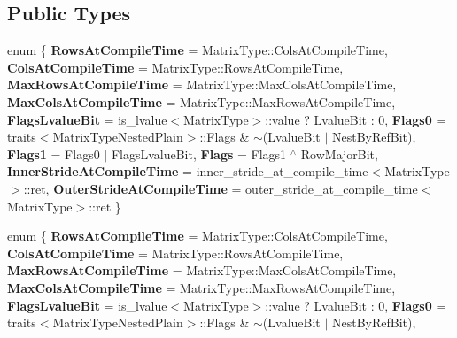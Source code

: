 \subsection*{Public Types}
\begin{DoxyCompactItemize}
\item 
\mbox{\label{struct_eigen_1_1internal_1_1traits_3_01_transpose_3_01_matrix_type_01_4_01_4_a919041c02840d6285481daa479a6c891}} 
enum \{ \newline
{\bfseries Rows\+At\+Compile\+Time} = Matrix\+Type\+:\+:Cols\+At\+Compile\+Time, 
{\bfseries Cols\+At\+Compile\+Time} = Matrix\+Type\+:\+:Rows\+At\+Compile\+Time, 
{\bfseries Max\+Rows\+At\+Compile\+Time} = Matrix\+Type\+:\+:Max\+Cols\+At\+Compile\+Time, 
{\bfseries Max\+Cols\+At\+Compile\+Time} = Matrix\+Type\+:\+:Max\+Rows\+At\+Compile\+Time, 
\newline
{\bfseries Flags\+Lvalue\+Bit} = is\+\_\+lvalue$<$Matrix\+Type$>$\+:\+:value ? Lvalue\+Bit \+: 0, 
{\bfseries Flags0} = traits$<$Matrix\+Type\+Nested\+Plain$>$\+:\+:Flags \& $\sim$(Lvalue\+Bit $\vert$ Nest\+By\+Ref\+Bit), 
{\bfseries Flags1} = Flags0 $\vert$ Flags\+Lvalue\+Bit, 
{\bfseries Flags} = Flags1 $^\wedge$ Row\+Major\+Bit, 
\newline
{\bfseries Inner\+Stride\+At\+Compile\+Time} = inner\+\_\+stride\+\_\+at\+\_\+compile\+\_\+time$<$Matrix\+Type$>$\+:\+:ret, 
{\bfseries Outer\+Stride\+At\+Compile\+Time} = outer\+\_\+stride\+\_\+at\+\_\+compile\+\_\+time$<$Matrix\+Type$>$\+:\+:ret
 \}
\item 
\mbox{\label{struct_eigen_1_1internal_1_1traits_3_01_transpose_3_01_matrix_type_01_4_01_4_a504f160909692359b7253f46cfabf168}} 
enum \{ \newline
{\bfseries Rows\+At\+Compile\+Time} = Matrix\+Type\+:\+:Cols\+At\+Compile\+Time, 
{\bfseries Cols\+At\+Compile\+Time} = Matrix\+Type\+:\+:Rows\+At\+Compile\+Time, 
{\bfseries Max\+Rows\+At\+Compile\+Time} = Matrix\+Type\+:\+:Max\+Cols\+At\+Compile\+Time, 
{\bfseries Max\+Cols\+At\+Compile\+Time} = Matrix\+Type\+:\+:Max\+Rows\+At\+Compile\+Time, 
\newline
{\bfseries Flags\+Lvalue\+Bit} = is\+\_\+lvalue$<$Matrix\+Type$>$\+:\+:value ? Lvalue\+Bit \+: 0, 
{\bfseries Flags0} = traits$<$Matrix\+Type\+Nested\+Plain$>$\+:\+:Flags \& $\sim$(Lvalue\+Bit $\vert$ Nest\+By\+Ref\+Bit), 

\end{DoxyCompactItemize}
